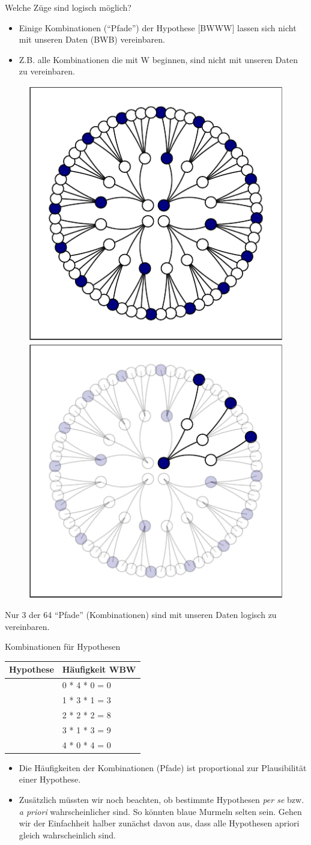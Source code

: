 \documentclass[
  ngerman,
  ignorenonframetext,
]{beamer}
\providecommand{\tightlist}{%
  \setlength{\itemsep}{0pt}\setlength{\parskip}{0pt}}
\begin{document}
\begin{frame}{Welche Züge sind logisch möglich?}
\protect\hypertarget{welche-zuxfcge-sind-logisch-muxf6glich}{}
\begin{itemize}
\tightlist
\item
  Einige Kombinationen (``Pfade'') der Hypothese {[}BWWW{]} lassen sich
  nicht mit unseren Daten (BWB) vereinbaren.
\item
  Z.B. alle Kombinationen die mit W beginnen, sind nicht mit unseren
  Daten zu vereinbaren.
\end{itemize}

\begin{figure}[H]
\includegraphics[width=0.33\linewidth]{unnamed-chunk-11-1} \includegraphics[width=0.33\linewidth]{unnamed-chunk-11-2} \end{figure}

Nur 3 der 64 ``Pfade'' (Kombinationen) sind mit unseren Daten logisch zu
vereinbaren.
\end{frame}

\begin{frame}{Kombinationen für Hypothesen}
\protect\hypertarget{kombinationen-fuxfcr-hypothesen}{}
\begin{tabular}{l|l}
\hline
Hypothese & Häufigkeit WBW\\
\hline
[W W W W] & 0 * 4 * 0 = 0\\
\hline
[B W W W] & 1 * 3 * 1 = 3\\
\hline
[B B W W] & 2 * 2 * 2 = 8\\
\hline
[B B B W] & 3 * 1 * 3 = 9\\
\hline
[B B B B] & 4 * 0 * 4 = 0\\
\hline
\end{tabular}

\begin{itemize}
\item
  Die Häufigkeiten der Kombinationen (Pfade) ist proportional zur
  Plausibilität einer Hypothese.
\item
  Zusätzlich müssten wir noch beachten, ob bestimmte Hypothesen
  \emph{per se} bzw. \emph{a priori} wahrscheinlicher sind. So könnten
  blaue Murmeln selten sein. Gehen wir der Einfachheit halber zunächst
  davon aus, dass alle Hypothesen apriori gleich wahrscheinlich sind.
\end{itemize}
\end{frame}
\end{document}

